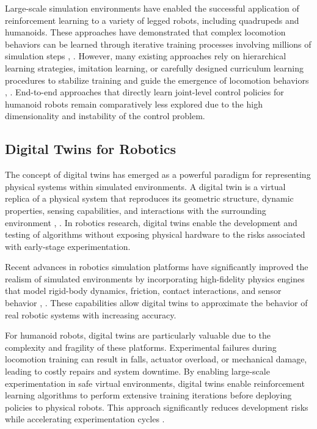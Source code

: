 \documentclass[pdflatex,sn-mathphys-num]{sn-jnl}%
\theoremstyle{thmstyleone}%
\theoremstyle{thmstyletwo}%
\theoremstyle{thmstylethree}%
\begin{document}
Large-scale simulation environments have enabled the successful application of reinforcement learning to a variety of legged robots, including quadrupeds and humanoids. These approaches have demonstrated that complex locomotion behaviors can be learned through iterative training processes involving millions of simulation steps \cite{bib6}, \cite{bib7}. However, many existing approaches rely on hierarchical learning strategies, imitation learning, or carefully designed curriculum learning procedures to stabilize training and guide the emergence of locomotion behaviors \cite{bib8}, \cite{bib9}. End-to-end approaches that directly learn joint-level control policies for humanoid robots remain comparatively less explored due to the high dimensionality and instability of the control problem.

\subsection{Digital Twins for Robotics}
The concept of digital twins has emerged as a powerful paradigm for representing physical systems within simulated environments. A digital twin is a virtual replica of a physical system that reproduces its geometric structure, dynamic properties, sensing capabilities, and interactions with the surrounding environment \cite{bib10}, \cite{bib11}. In robotics research, digital twins enable the development and testing of algorithms without exposing physical hardware to the risks associated with early-stage experimentation.

Recent advances in robotics simulation platforms have significantly improved the realism of simulated environments by incorporating high-fidelity physics engines that model rigid-body dynamics, friction, contact interactions, and sensor behavior \cite{bib3}, \cite{bib12}. These capabilities allow digital twins to approximate the behavior of real robotic systems with increasing accuracy.

For humanoid robots, digital twins are particularly valuable due to the complexity and fragility of these platforms. Experimental failures during locomotion training can result in falls, actuator overload, or mechanical damage, leading to costly repairs and system downtime. By enabling large-scale experimentation in safe virtual environments, digital twins enable reinforcement learning algorithms to perform extensive training iterations before deploying policies to physical robots. This approach significantly reduces development risks while accelerating experimentation cycles \cite{bib13}.
\end{document}
